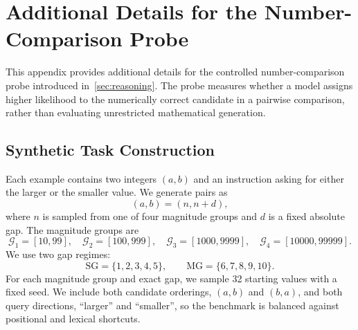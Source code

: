 \section{Additional Details for the Number-Comparison Probe}
\label{app:number-comparison}

This appendix provides additional details for the controlled number-comparison probe introduced in~\cref{sec:reasoning}. The probe measures whether a model assigns higher likelihood to the numerically correct candidate in a pairwise comparison, rather than evaluating unrestricted mathematical generation.

\subsection{Synthetic Task Construction}
\label{app:number-comparison-task}

Each example contains two integers $(a,b)$ and an instruction asking for either the larger or the smaller value. We generate pairs as
\begin{equation}
    (a,b)=(n,n+d),
    \label{eq:app-fixed-gap-pair}
\end{equation}
where $n$ is sampled from one of four magnitude groups and $d$ is a fixed absolute gap. The magnitude groups are
\begin{equation}
\mathcal{G}_1=[10,99],\quad
\mathcal{G}_2=[100,999],\quad
\mathcal{G}_3=[1000,9999],\quad
\mathcal{G}_4=[10000,99999].
\label{eq:app-magnitude-groups}
\end{equation}
We use two gap regimes:
\begin{equation}
\mathrm{SG}=\{1,2,3,4,5\},\qquad
\mathrm{MG}=\{6,7,8,9,10\}.
\label{eq:app-gap-regimes}
\end{equation}
For each magnitude group and exact gap, we sample 32 starting values with a fixed seed. We include both candidate orderings, $(a,b)$ and $(b,a)$, and both query directions, ``larger'' and ``smaller'', so the benchmark is balanced against positional and lexical shortcuts.

